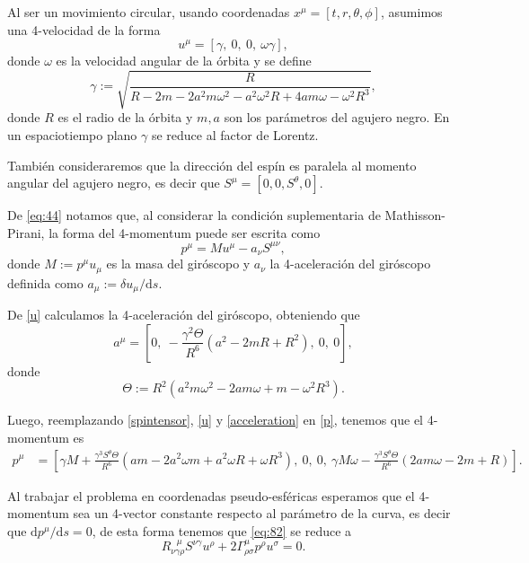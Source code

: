 Al ser un movimiento circular, usando coordenadas $x^{\mu}=[t,r,\theta,\phi]$, asumimos una 4-velocidad de la forma
\begin{equation}
\label{u}
u^{\mu} = \left[ \gamma, \  0, \  0, \  \omega \gamma \right],
\end{equation}
donde $\omega$ es la velocidad angular de la órbita y se define
\begin{equation}
\gamma:= \sqrt{ \frac{R}{R - 2m - 2 a^{2} m \omega^{2} - a^{2} \omega^{2} R + 4 a m \omega - \omega^{2} R^{3}}},
\end{equation}
donde $R$ es el radio de la órbita y $m,a$ son los parámetros del agujero negro. En un espaciotiempo plano $ \gamma $ se reduce al factor de Lorentz.

También consideraremos que la dirección del espín es paralela al momento angular del agujero negro, es decir que $S^{\mu} = \left[ 0,0,S^{\theta},0 \right]$.

De \eqref{eq:44} notamos que, al considerar la condición suplementaria de Mathisson-Pirani, la forma del 4-momentum puede ser escrita como
\begin{equation}
\label{p}
p^{\mu} =  M u^{\mu} - a_{\nu} S^{\mu \nu}, 
\end{equation}
donde $M:= p^{\mu} u_{\mu}$ es la masa del giróscopo y $a_{\nu}$ la 4-aceleración del giróscopo definida como $a_{\mu} := \delta u_{\mu} / \mathrm{d} s$.

De \eqref{u} calculamos la 4-aceleración del giróscopo, obteniendo que
\begin{equation}
\label{acceleration}
a^{\mu} = \left[ 0, \  - \frac{\gamma^2 \Theta}{R^6} \left(a^{2} - 2 m R + R^{2}\right), \  0, \  0\right],
\end{equation}
donde
\begin{equation}
\label{Theta}
\Theta := R^{2} \left( a^{2} m \omega^{2} - 2 a m \omega + m - \omega^{2} R^{3}\right).
\end{equation}

Luego, reemplazando \eqref{spintensor}, \eqref{u} y \eqref{acceleration} en \eqref{p}, tenemos que el 4-momentum es
\begin{align}
\label{mom5}
p^{\mu} &= \left[ \gamma M + \frac{\gamma^3 S^{\theta} \Theta}{R^6}  \left( a m - 2 a^{2} \omega m + a^{2}\omega R + \omega R^{3}\right), \  0, \  0, \ \gamma M \omega  - \frac{\gamma^3 S^{\theta} \Theta}{R^6} \left( 2 a m \omega - 2 m + R \right)\right].
\end{align}

Al trabajar el problema en coordenadas pseudo-esféricas esperamos que el 4-momentum sea un 4-vector constante respecto al parámetro de la curva, es decir que $\mathrm{d} p^{\mu} / \mathrm{d}s  = 0$, de esta forma tenemos que \eqref{eq:82} se reduce a
\begin{equation}
\label{dp}
R_{\nu \gamma \rho}^{\ \ \ \mu} S^{\nu \gamma} u^{\rho} + 2 \Gamma^{\mu}_{\rho \sigma} p^{\rho} u^{\sigma} = 0.
\end{equation}

